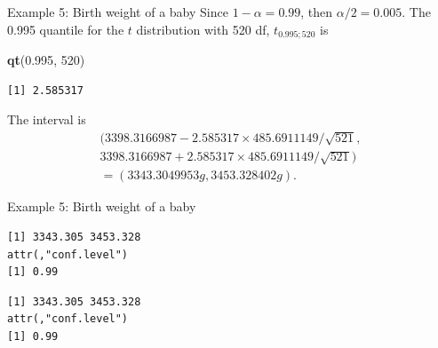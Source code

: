 \documentclass[
  ignorenonframetext,
]{beamer}
\newenvironment{Shaded}{\begin{snugshade}}{\end{snugshade}}
\newcommand{\AttributeTok}[1]{\textcolor[rgb]{0.13,0.29,0.53}{#1}}
\newcommand{\CommentTok}[1]{\textcolor[rgb]{0.56,0.35,0.01}{\textit{#1}}}
\newcommand{\DecValTok}[1]{\textcolor[rgb]{0.00,0.00,0.81}{#1}}
\newcommand{\FloatTok}[1]{\textcolor[rgb]{0.00,0.00,0.81}{#1}}
\newcommand{\FunctionTok}[1]{\textcolor[rgb]{0.13,0.29,0.53}{\textbf{#1}}}
\newcommand{\NormalTok}[1]{#1}
\newcommand{\OtherTok}[1]{\textcolor[rgb]{0.56,0.35,0.01}{#1}}
\newcommand{\SpecialCharTok}[1]{\textcolor[rgb]{0.81,0.36,0.00}{\textbf{#1}}}
\newcommand{\StringTok}[1]{\textcolor[rgb]{0.31,0.60,0.02}{#1}}
\begin{document}
\begin{frame}[fragile]{Example 5: Birth weight of a baby}
\protect\hypertarget{example-5-birth-weight-of-a-baby-4}{}
Since \(1-\alpha=0.99\), then \(\alpha/2=0.005\). The 0.995 quantile for
the \(t\) distribution with 520 df, \(t_{0.995;520}\) is

\normalsize

\begin{Shaded}
\begin{Highlighting}[]
\FunctionTok{qt}\NormalTok{(}\FloatTok{0.995}\NormalTok{, }\DecValTok{520}\NormalTok{)}
\end{Highlighting}
\end{Shaded}

\begin{verbatim}
[1] 2.585317
\end{verbatim}

\normalsize

The interval is \[\begin{array}{ll}
(3398.3166987-2.585317\times 485.6911149/\sqrt{521},\\
3398.3166987+2.585317\times 485.6911149/\sqrt{521})\\
=(3343.3049953g, 3453.328402g).
\end{array}\]
\end{frame}

\begin{frame}[fragile]{Example 5: Birth weight of a baby}
\protect\hypertarget{example-5-birth-weight-of-a-baby-5}{}
\normalsize

\begin{Shaded}
\end{Shaded}

\begin{verbatim}
[1] 3343.305 3453.328
attr(,"conf.level")
[1] 0.99
\end{verbatim}

\begin{Shaded}
\end{Shaded}

\begin{verbatim}
[1] 3343.305 3453.328
attr(,"conf.level")
[1] 0.99
\end{verbatim}

\normalsize
\end{frame}
\end{document}
